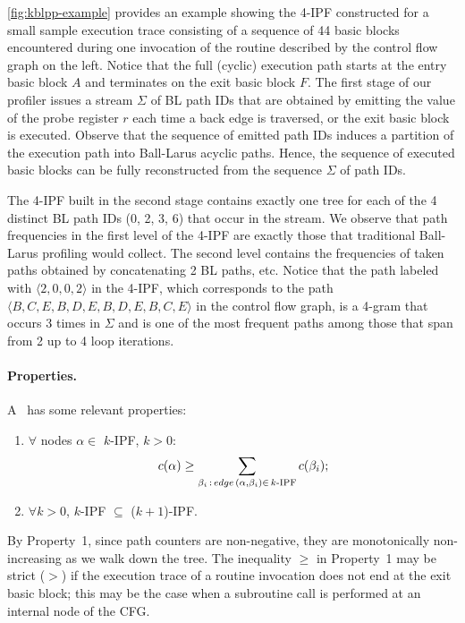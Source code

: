 \begin{example} \myfigure\ref{fig:kblpp-example} provides an example showing the 4-IPF constructed for a small sample execution trace consisting of a sequence of 44 basic blocks encountered during one invocation of the routine described by the control flow graph on the left. Notice that the full (cyclic) execution path starts at the entry basic block $A$ and terminates on the exit basic block $F$. The first stage of our profiler issues a stream $\Sigma$ of BL path IDs that are obtained by emitting the value of the probe register $r$ each time a back edge is traversed, or the exit basic block is executed. Observe that the sequence of emitted path IDs induces a partition of the execution path into Ball-Larus acyclic paths. Hence, the sequence of executed basic blocks can be fully reconstructed from the sequence $\Sigma$ of path IDs.

The 4-IPF built in the second stage contains exactly one tree for each of the 4 distinct BL path IDs (0, 2, 3, 6) that occur in the stream. We observe that path frequencies in the first level of the 4-IPF are exactly those that traditional Ball-Larus profiling would collect. The second level contains the frequencies of taken paths obtained by concatenating 2 BL paths, etc. Notice that the path labeled with $\langle 2, 0, 0, 2\rangle$ in the 4-IPF, which corresponds to the path $\langle B, C, E, B, D, E, B, D, E, B, C, E \rangle$ in the control flow graph, is a 4-gram that occurs 3 times in $\Sigma$ and is one of the most frequent paths among those that span from 2 up to 4 loop iterations.
\end{example}

\paragraph*{Properties.} 
A \kipf\ has some relevant properties:
\begin{enumerate}
\item $\forall$ nodes $\alpha\in$ $k$-IPF, $k>0$: $$c(\alpha)\ge\sum_{\beta_i\,:\,edge\,(\alpha,\beta_i)\in\,k\mbox{\scriptsize-IPF}} c(\beta_i);$$
\item $\forall k>0$, $k$-IPF $\subseteq$ ($k+1$)-IPF.
\end{enumerate}

\noindent By Property~1, since path counters are non-negative, they are monotonically non-increasing as we walk down the tree. The inequality $\ge$ in Property~1 may be strict ($>$) if the execution trace of a routine invocation does not end at the exit basic block; this may be the case when a subroutine call is performed at an internal node of the CFG. 

